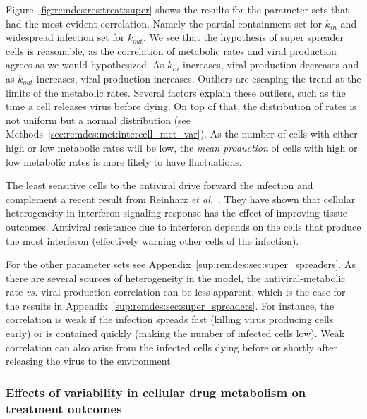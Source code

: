 Figure~\ref{fig:remdes:res:treat:super} shows the results for the parameter sets that had the most evident correlation. Namely the partial containment set for $k_{in}$ and widespread infection set for $k_{out}$. We see that the hypothesis of super spreader cells is reasonable, as the correlation of metabolic rates and viral production agrees as we would hypothesized. As $k_{in}$ increases, viral production decreases and as $k_{out}$ increases, viral production increases. Outliers are escaping the trend at the limits of the metabolic rates. Several factors explain these outliers, such as the time a cell releases virus before dying. On top of that, the distribution of rates is not uniform but a normal distribution (see Methods~\ref{sec:remdes:met:intercell_met_var}). As the number of cells with either high or low metabolic rates will be low, the \textit{mean production} of cells with high or low metabolic rates is more likely to have fluctuations. 

The least sensitive cells to the antiviral drive forward the infection and complement a recent result from Reinharz \emph{et al.}~\cite{reinharz_understanding_2021}. They have shown that cellular heterogeneity in interferon signaling response has the effect of improving tissue outcomes. Antiviral resistance due to interferon depends on the cells that produce the most interferon (effectively warning other cells of the infection).

For the other parameter sets see Appendix~\ref{sup:remdes:sec:super_spreaders}. As there are several sources of heterogeneity in the model, the antiviral-metabolic rate \textit{vs.} viral production correlation can be less apparent, which is the case for the results in Appendix~\ref{sup:remdes:sec:super_spreaders}. For instance, the correlation is weak if the infection spreads fast (killing virus producing cells early) or is contained quickly (making the number of infected cells low). Weak correlation can also arise from the infected cells dying before or shortly after releasing the virus to the environment.

\subsubsection{Effects of variability in cellular drug metabolism on treatment outcomes}\label{sec:remdes:res:change-sd}



